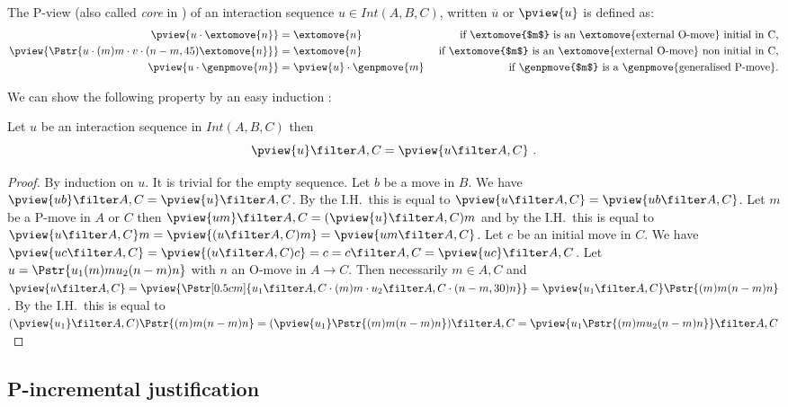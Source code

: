 The P-view (also called \emph{core} in
\cite{McCusker-GamesandFullAbstrac}) of an interaction sequence $u
\in Int(A,B,C)$, written $\overline{u}$ or $\pview{u}$ is defined
as:
\begin{align*}
\pview{u\cdot \extomove{n}} &= \extomove{n} &
\mbox{ if \extomove{$m$} is an \extomove{external O-move} initial in C,}\\
\pview{\Pstr{u\cdot (m)m\cdot v \cdot (n-m,45){\extomove{n}} }} &= \extomove{n} &\mbox{ if \extomove{$m$} is an \extomove{external O-move} non initial in C,}\\
\pview{u \cdot \genpmove{m}} &= \pview{u}\cdot \genpmove{m}  & \mbox{ if \genpmove{$m$} is a \genpmove{generalised P-move}.}\\
\end{align*}

We can show the following property by an easy induction :
\begin{lemma}
\label{lem:pviewAC_eq_ACpview}
 Let $u$ be an interaction sequence in $Int(A,B,C)$ then
$$\pview{u} \filter A,C = \pview{u \filter A,C} \ .$$
\end{lemma}
\begin{proof}
  By induction on $u$. It is trivial for the empty sequence.
Let $b$ be a move in $B$. We have $\pview{u b} \filter A,C =
\pview{u} \filter A,C$. By the I.H.\ this is equal to $\pview{u
\filter A,C} = \pview{u b\filter A,C}$. Let $m$ be a P-move in $A$
or $C$ then $\pview{u m} \filter A,C = (\pview{u} \filter A,C) m$
and by the I.H.\ this is equal to $\pview{u \filter A,C} m =
\pview{(u \filter A,C) m} = \pview{u m \filter A,C}$. Let $c$ be an
initial move in $C$. We have $\pview{u c \filter A,C}  = \pview{(u
\filter A,C) c} = c =  c \filter A,C = \pview{u c} \filter A,C$. Let
$u = \Pstr{u_1 (m){m} u_2 (n-m){n}}$ with $n$ an O-move in
$A\rightarrow C$. Then necessarily $m\in A,C$ and $ \pview{u\filter
A,C} = \pview{\Pstr[0.5cm]{u_1\filter A,C \cdot (m){m} \cdot
u_2\filter A,C \cdot (n-m,30){n}}} =
 \pview{u_1 \filter A,C} \Pstr{(m){m} (n-m){n}}$. By the I.H.\ this is equal to
$(\pview{u_1}\filter A,C) \Pstr{(m){m} (n-m){n}} = (\pview{u_1}
\Pstr{(m){m} (n-m){n}} ) \filter A,C  = \pview{u_1 \Pstr{(m){m} u_2
(n-m){n}}} \filter A,C$
\end{proof}


\subsection{P-incremental justification}


